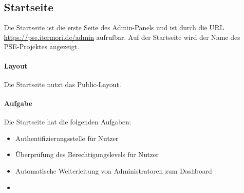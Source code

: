 \subsection{Startseite}

Die Startseite ist die erste Seite des Admin-Panels und ist durch die URL \href{https://pse.itermori.de/admin}{https://pse.itermori.de/admin} aufrufbar.
Auf der Startseite wird der Name des PSE-Projektes angezeigt.

\paragraph{Layout}
Die Startseite nutzt das Public-Layout.

\paragraph{Aufgabe}
Die Startseite hat die folgenden Aufgaben:

\begin{itemize}
    \item Authentifizierungsstelle für Nutzer
    \item Überprüfung des Berechtigungslevels für Nutzer
    \item Automatische Weiterleitung von Administratoren zum Dashboard
    \item 
\end{itemize}